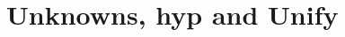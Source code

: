 \documentclass[11pt]{book}
\begin{document}

%

%

%


%


%

\chapter{Unknowns, hyp and Unify}
\label{chap:unknowns}

\end{document}

